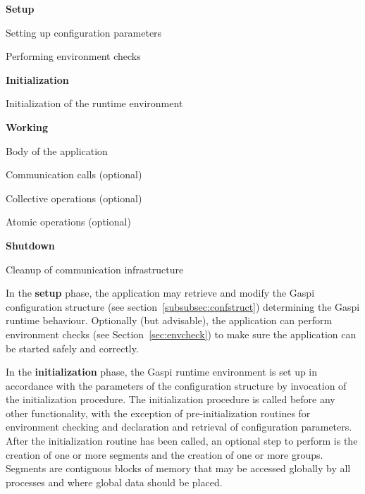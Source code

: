 \documentclass{article}
\newlength{\st}\setlength{\st}{0pt}
\newcommand{\GASPI}{{\sc Gaspi}}
\begin{document}
\begin{itemize}
\item \textbf{Setup}
  \begin{description}
  \item Setting up configuration parameters
  \item Performing environment checks
  \end{description}
\item \textbf{Initialization}
  \begin{description}
  \item Initialization of the runtime environment
  \end{description}
\item \textbf{Working}
  \begin{description}
  \item Body of the application
  \begin{description}
    \item Communication calls (optional)
    \item Collective operations (optional)
    \item Atomic operations (optional)
  \end{description}
  \end{description}
\item \textbf{Shutdown}
  \begin{description}
  \item Cleanup of communication infrastructure
  \end{description}
\end{itemize}


In the \textbf{setup} phase, the application may retrieve and modify 
the \GASPI{} configuration structure (see section~\ref{subsubsec:confstruct}) 
determining the \GASPI{} runtime behaviour. Optionally (but
advisable), the application can perform environment checks (see
Section~\ref{sec:envcheck}) to make sure the application can be
started safely and correctly.

In the \textbf{initialization} phase, the \GASPI{} runtime environment
is set up in accordance with the parameters of the configuration structure
by invocation of the initialization procedure. 
The initialization procedure is called before any other functionality, with the
exception of pre-initialization routines for environment checking and
declaration and retrieval of configuration parameters.  After the
initialization routine has been called, an
optional step to perform is the creation of one or more segments and the creation of
one or more groups.
Segments are contiguous blocks of memory that may be accessed
globally by all processes and where global data should be placed.
\end{document}
